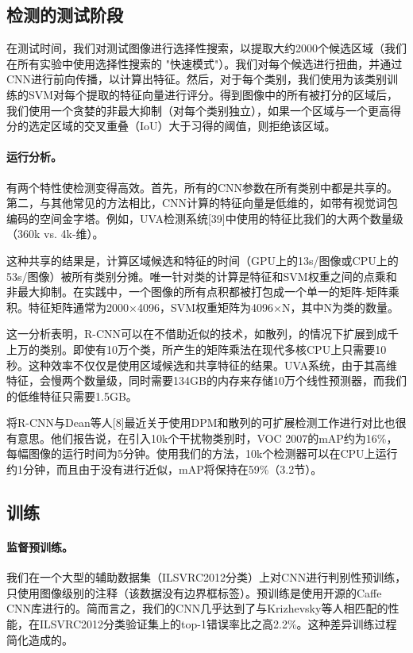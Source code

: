 \documentclass[../main.tex]{subfile}
\begin{document}
\subsection{检测的测试阶段}

在测试时间，我们对测试图像进行选择性搜索，以提取大约2000个候选区域（我们在所有实验中使用选择性搜索的 "快速模式"）。我们对每个候选进行扭曲，并通过CNN进行前向传播，以计算出特征。然后，对于每个类别，我们使用为该类别训练的SVM对每个提取的特征向量进行评分。得到图像中的所有被打分的区域后，我们使用一个贪婪的非最大抑制（对每个类别独立），如果一个区域与一个更高得分的选定区域的交叉重叠（IoU）大于习得的阈值，则拒绝该区域。

\paragraph{运行分析。}有两个特性使检测变得高效。首先，所有的CNN参数在所有类别中都是共享的。第二，与其他常见的方法相比，CNN计算的特征向量是低维的，如带有视觉词包编码的空间金字塔。例如，UVA检测系统[39]中使用的特征比我们的大两个数量级（360k vs. 4k-维）。

这种共享的结果是，计算区域候选和特征的时间（GPU上的13s/图像或CPU上的53s/图像）被所有类别分摊。唯一针对类的计算是特征和SVM权重之间的点乘和非最大抑制。在实践中，一个图像的所有点积都被打包成一个单一的矩阵-矩阵乘积。特征矩阵通常为2000×4096，SVM权重矩阵为4096×N，其中N为类的数量。

这一分析表明，R-CNN可以在不借助近似的技术，如散列，的情况下扩展到成千上万的类别。即使有10万个类，所产生的矩阵乘法在现代多核CPU上只需要10秒。这种效率不仅仅是使用区域候选和共享特征的结果。UVA系统，由于其高维特征，会慢两个数量级，同时需要134GB的内存来存储10万个线性预测器，而我们的低维特征只需要1.5GB。

将R-CNN与Dean等人[8]最近关于使用DPM和散列的可扩展检测工作进行对比也很有意思。他们报告说，在引入10k个干扰物类别时，VOC 2007的mAP约为16\%，每幅图像的运行时间为5分钟。使用我们的方法，10k个检测器可以在CPU上运行约1分钟，而且由于没有进行近似，mAP将保持在59\%（3.2节）。

\subsection{训练}

\paragraph{监督预训练。}我们在一个大型的辅助数据集（ILSVRC2012分类）上对CNN进行判别性预训练，只使用图像级别的注释（该数据没有边界框标签）。预训练是使用开源的Caffe CNN库\cite{caffe}进行的。简而言之，我们的CNN几乎达到了与Krizhevsky等人\cite{alexnet}相匹配的性能，在ILSVRC2012分类验证集上的top-1错误率比之高2.2\%。这种差异训练过程简化造成的。
\end{document}
